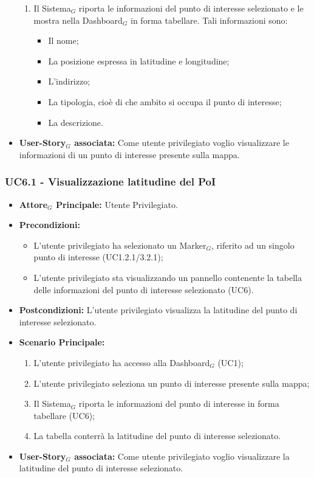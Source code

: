 \documentclass[10pt]{article}
\begin{document}
\begin{justify}
\begin{itemize}
\begin{enumerate}
            \item Il Sistema$_G$ riporta le informazioni del punto di interesse selezionato e le mostra nella Dashboard$_G$ in forma tabellare. Tali informazioni sono:
       \begin{itemize}
       \item Il nome;
       \item La posizione espressa in latitudine e longitudine;
       \item L'indirizzo;
       \item La tipologia, cioè di che ambito si occupa il punto di interesse;
       \item La descrizione.
       \end{itemize}
        \end{enumerate}
     \item \textbf{User-Story$_G$ associata:} Come utente privilegiato voglio visualizzare le informazioni di un punto di interesse presente sulla mappa. 
 \end{itemize}
 \subsubsection{\textbf{UC6.1 - Visualizzazione latitudine del PoI}}
 \begin{itemize}
     \item \textbf{Attore$_G$ Principale:} Utente Privilegiato.
     \item \textbf{Precondizioni:}
       \begin{itemize}
    	        \item L'utente privilegiato ha selezionato un Marker$_G$, riferito ad un singolo punto di interesse (UC1.2.1/3.2.1);
          \item L'utente privilegiato sta visualizzando un pannello contenente la tabella delle informazioni del punto di interesse selezionato (UC6).
       \end{itemize}
     \item \textbf{Postcondizioni:} L'utente privilegiato visualizza la latitudine del punto di interesse selezionato.
     \item \textbf{Scenario Principale:}
        \begin{enumerate}
            \item L'utente privilegiato ha accesso alla Dashboard$_G$ (UC1);
            \item L'utente privilegiato seleziona un punto di interesse presente sulla mappa;
            \item Il Sistema$_G$ riporta le informazioni del punto di interesse in forma tabellare (UC6);
            \item La tabella conterrà la latitudine del punto di interesse selezionato.
        \end{enumerate}
     \item \textbf{User-Story$_G$ associata:} Come utente privilegiato voglio visualizzare la latitudine del punto di interesse selezionato. 
 \end{itemize}

\end{justify}
\end{document}

